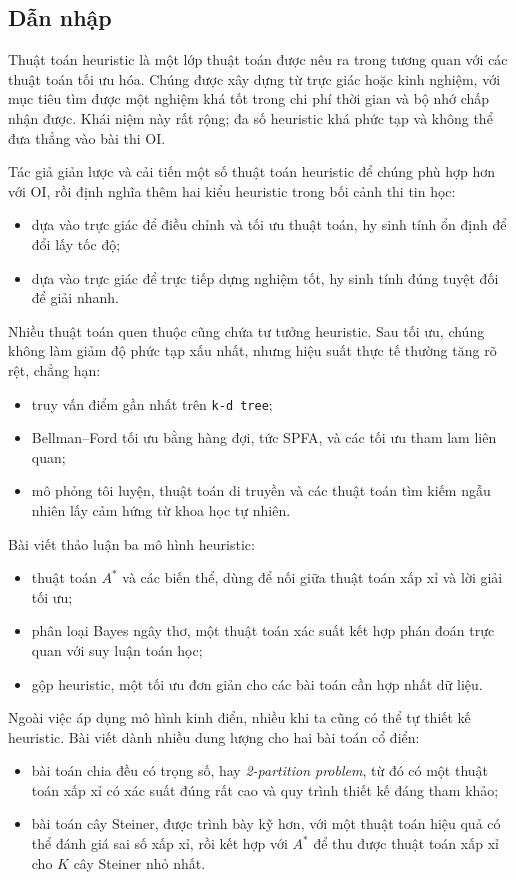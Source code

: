 \documentclass[11pt]{article}
\begin{document}
\subsection{Dẫn nhập}

Thuật toán heuristic là một lớp thuật toán được nêu ra trong tương quan với các
thuật toán tối ưu hóa. Chúng được xây dựng từ trực giác hoặc kinh nghiệm, với
mục tiêu tìm được một nghiệm khá tốt trong chi phí thời gian và bộ nhớ chấp
nhận được. Khái niệm này rất rộng; đa số heuristic khá phức tạp và không thể
đưa thẳng vào bài thi OI.

Tác giả giản lược và cải tiến một số thuật toán heuristic để chúng phù hợp hơn
với OI, rồi định nghĩa thêm hai kiểu heuristic trong bối cảnh thi tin học:
\begin{itemize}
  \item dựa vào trực giác để điều chỉnh và tối ưu thuật toán, hy sinh tính ổn
  định để đổi lấy tốc độ;
  \item dựa vào trực giác để trực tiếp dựng nghiệm tốt, hy sinh tính đúng tuyệt
  đối để giải nhanh.
\end{itemize}

Nhiều thuật toán quen thuộc cũng chứa tư tưởng heuristic. Sau tối ưu, chúng
không làm giảm độ phức tạp xấu nhất, nhưng hiệu suất thực tế thường tăng rõ rệt,
chẳng hạn:
\begin{itemize}
  \item truy vấn điểm gần nhất trên \texttt{k-d tree};
  \item Bellman--Ford tối ưu bằng hàng đợi, tức SPFA, và các tối ưu tham lam
  liên quan;
  \item mô phỏng tôi luyện, thuật toán di truyền và các thuật toán tìm kiếm
  ngẫu nhiên lấy cảm hứng từ khoa học tự nhiên.
\end{itemize}

Bài viết thảo luận ba mô hình heuristic:
\begin{itemize}
  \item thuật toán \(A^*\) và các biến thể, dùng để nối giữa thuật toán xấp xỉ
  và lời giải tối ưu;
  \item phân loại Bayes ngây thơ, một thuật toán xác suất kết hợp phán đoán
  trực quan với suy luận toán học;
  \item gộp heuristic, một tối ưu đơn giản cho các bài toán cần hợp nhất dữ
  liệu.
\end{itemize}

Ngoài việc áp dụng mô hình kinh điển, nhiều khi ta cũng có thể tự thiết kế
heuristic. Bài viết dành nhiều dung lượng cho hai bài toán cổ điển:
\begin{itemize}
  \item bài toán chia đều có trọng số, hay \emph{2-partition problem}, từ đó có
  một thuật toán xấp xỉ có xác suất đúng rất cao và quy trình thiết kế đáng tham
  khảo;
  \item bài toán cây Steiner, được trình bày kỹ hơn, với một thuật toán hiệu quả
  có thể đánh giá sai số xấp xỉ, rồi kết hợp với \(A^*\) để thu được thuật toán
  xấp xỉ cho \(K\) cây Steiner nhỏ nhất.
\end{itemize}
\end{document}
